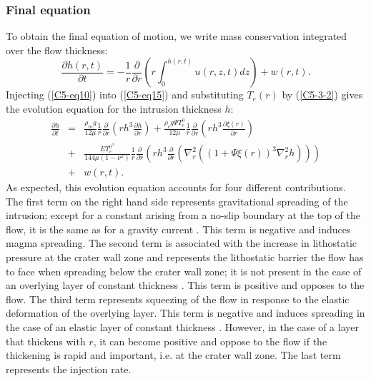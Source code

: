\subsubsection{Final equation}
\label{C5-Final_Equation}

To obtain  the final  equation of motion,  we write  mass conservation
integrated over the flow thickness:
\begin{equation}
  \frac{\partial h(r,t)}{\partial t} = -\frac{1}{r} \frac{\partial}{\partial r} \left( r \int_{0}^{h(r,t)} u(r,z,t) dz\right ) + w(r,t) .
  \label{C5-eq15}
\end{equation}
Injecting  (\ref{C5-eq10})   into  (\ref{C5-eq15})   and  substituting
$T_{e}(r)$  by (\ref{C5-3-2})  gives  the evolution  equation for  the
intrusion thickness $h$:
\begin{eqnarray}
  \frac{\partial h}{\partial t} &=&\frac{\rho_{m}g}{12 \mu} \frac{1}{r} \frac{\partial}{\partial r}\left (r h^{3} \frac{\partial h}{\partial r} \right)+ \frac{\rho_{c}g\Psi T_{e}^0}{12 \mu} \frac{1}{r} \frac{\partial}{\partial r}\left ( r h^{3} \frac{\partial \xi(r)}{\partial r}\right ) \nonumber \\
                                &+&\frac{E       T_{e}^{0^{3}}}{144\mu
                                    (1-\nu^{2})}\frac{1}{r}\frac{\partial}{\partial
                                    r}\left       (      r       h^{3}
                                    \frac{\partial}{\partial        r}
                                    \left(\nabla^{2}_{r}      ((1+\Psi
                                    \xi(r))^{3}\nabla^{2}_{r}h )\right)\right )\nonumber\\
                                &+& w(r,t).
                                    \label{C5-eq16}
\end{eqnarray}
As  expected,  this evolution  equation  accounts  for four  different
contributions.   The first  term  on the  right  hand side  represents
gravitational  spreading  of  the  intrusion; except  for  a  constant
arising from a no-slip boundary at the top of the flow, it is the same
as for a gravity current  \citep{Huppert:1982a}. This term is negative
and induces  magma spreading. The  second term is associated  with the
increase  in  lithostatic  pressure  at   the  crater  wall  zone  and
represents the lithostatic barrier the flow has to face when spreading
below  the crater  wall zone;  it is  not present  in the  case of  an
overlying  layer of  constant thickness  \citep{Michaut:2011kg}.  This
term is positive  and opposes to the flow.  The  third term represents
squeezing of  the flow in response  to the elastic deformation  of the
overlying layer.  This  term is negative and induces  spreading in the
case    of     an    elastic     layer    of     constant    thickness
\citep{Michaut:2011kg}. However, in the case  of a layer that thickens
with  $r$, it  can  become positive  and  oppose to  the  flow if  the
thickening is rapid  and important, i.e. at the crater  wall zone. The
last term represents the injection rate.

